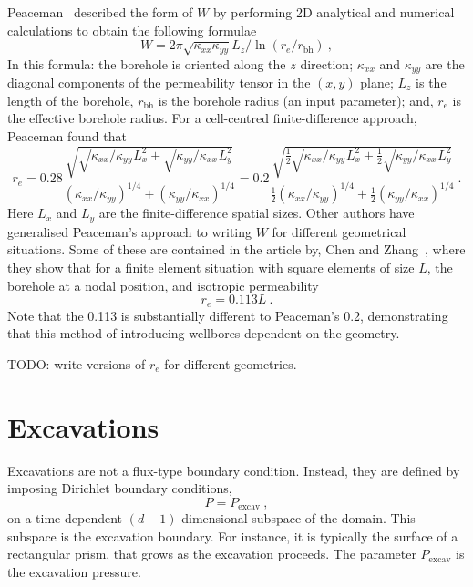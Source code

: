 \documentclass[]{scrreprt}
\begin{document}
Peaceman~\cite{peaceman1983} described the form of $W$ by performing
2D analytical and numerical calculations to obtain the following
formulae
\begin{equation}
W = 2\pi \sqrt{\kappa_{xx}\kappa_{yy}}L_{z}/\ln(r_{e}/r_{\mathrm{bh}})
\ ,
\end{equation}
In this formula: the borehole is oriented along the $z$ direction;
$\kappa_{xx}$ and $\kappa_{yy}$ are the diagonal components of the
permeability tensor in the $(x,y)$ plane; $L_{z}$ is the length of the borehole,
$r_{\mathrm{bh}}$ is the borehole radius (an input parameter); and,
$r_{e}$ is the effective borehole radius.  For a cell-centred
finite-difference approach, Peaceman found that
\begin{equation}
r_{e} = 0.28 \frac{\sqrt{\sqrt{\kappa_{xx}/\kappa_{yy}}L_{x}^{2} +
    \sqrt{\kappa_{yy}/\kappa_{xx}}L_{y}^{2}}}{(\kappa_{xx}/\kappa_{yy})^{1/4}
  + (\kappa_{yy}/\kappa_{xx})^{1/4}} 
= 0.2 \frac{\sqrt{\mbox{$\frac{1}{2}$}\sqrt{\kappa_{xx}/\kappa_{yy}}L_{x}^{2} +
    \mbox{$\frac{1}{2}$}\sqrt{\kappa_{yy}/\kappa_{xx}}L_{y}^{2}}}{\mbox{$\frac{1}{2}$}(\kappa_{xx}/\kappa_{yy})^{1/4}
  + \mbox{$\frac{1}{2}$}(\kappa_{yy}/\kappa_{xx})^{1/4}} \ .
\end{equation}
Here $L_{x}$ and $L_{y}$ are the finite-difference spatial sizes.
Other authors have generalised Peaceman's approach to writing $W$ for
different geometrical situations.  Some of these are contained in the
article by, Chen and Zhang~\cite{chen2009}, where they show that for a
finite element situation with square elements of size $L$, the
borehole at a nodal position, and isotropic permeability
\begin{equation}
r_{e} =  0.113L \ .
\end{equation}
Note that the 0.113 is substantially different to Peaceman's 0.2,
demonstrating that this method of introducing wellbores dependent on
the geometry.

TODO: write versions of $r_{e}$ for different geometries.




\section{Excavations}

Excavations are not a flux-type boundary condition.  Instead, they are
defined by imposing Dirichlet boundary conditions,
\begin{equation}
P = P_{\mathrm{excav}} \ ,
\end{equation}
on a time-dependent $(d-1)$-dimensional subspace of the domain.  This
subspace is the excavation boundary.  For instance, it is typically
the surface of a rectangular prism, that grows as the excavation
proceeds.  The parameter $P_{\mathrm{excav}}$ is the excavation
pressure.
\end{document}
